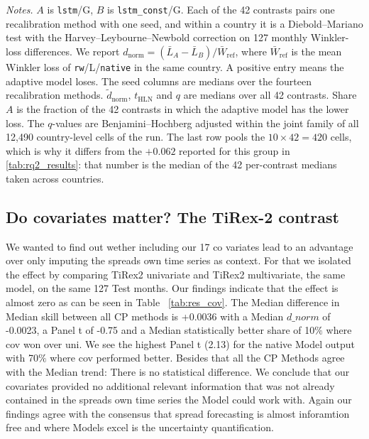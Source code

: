 \begin{table}[t]
\vspace{4pt}
{\footnotesize
\begin{minipage}{0.98\textwidth}
\textit{Notes.} $A$ is \texttt{lstm}/G, $B$ is \texttt{lstm\_const}/G. Each of the
42 contrasts pairs one recalibration method with one seed, and within a country it
is a Diebold--Mariano test with the Harvey--Leybourne--Newbold correction on 127
monthly Winkler-loss differences. We report
$d_{\mathrm{norm}}=(\bar L_A-\bar L_B)/\bar W_{\mathrm{ref}}$, where
$\bar W_{\mathrm{ref}}$ is the mean Winkler loss of \texttt{rw}/L/\texttt{native}
in the same country. A positive entry means the adaptive model loses. The seed
columns are medians over the fourteen recalibration methods. $\tilde d_{\mathrm{norm}}$,
$t_{\mathrm{HLN}}$ and $q$ are medians over all 42 contrasts. Share $A$ is the
fraction of the 42 contrasts in which the adaptive model has the lower loss.
The $q$-values are Benjamini--Hochberg adjusted within the joint family of all
12{,}490 country-level cells of the run. The last row pools the
$10\times 42=420$ cells, which is why it differs from the $+0.062$ reported for
this group in \cref{tab:rq2_results}: that number is the median of the 42
per-contrast medians taken across countries.
\end{minipage}}
\end{table}


\subsection{Do covariates matter? The TiRex-2 contrast}
\label{sec:res:covariates}
We wanted to find out wether including our 17 co variates lead to an advantage over only imputing the spreads own time series as context. For that we isolated the effect by comparing TiRex2 univariate and TiRex2 multivariate, the same model, on the same 127 Test months. Our findings indicate that the effect is almost zero as can be seen in Table ~\ref{tab:res_cov}. The Median difference in Median skill between all CP methods is +0.0036 with a Median $d\_norm$ of -0.0023, a Panel t of -0.75 and a Median statistically better share of 10$\%$ where cov won over uni. We see the highest Panel t (2.13) for the native Model output with 70$\%$ where cov performed better. Besides that all the CP Methods agree with the Median trend: There is no statistical difference. We conclude that our covariates provided no additional relevant information that was not already contained in the spreads own time series the Model could work with. Again our findings agree with the consensus that spread forecasting is almost inforamtion free and where Models excel is the uncertainty quantification. \\

